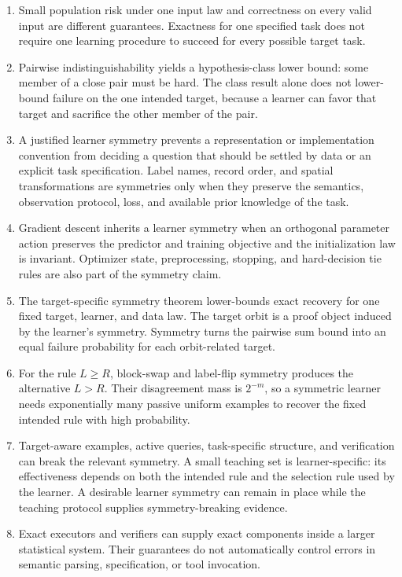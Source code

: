 \documentclass[11pt,twoside]{article}
\theoremstyle{definition}
\theoremstyle{remark}
\begin{document}
\begin{enumerate}[leftmargin=*]
\item Small population risk under one input law and correctness on every valid
input are different guarantees. Exactness for one specified task does not
require one learning procedure to succeed for every possible target task.
\item Pairwise indistinguishability yields a hypothesis-class lower bound:
some member of a close pair must be hard. The class result alone does not
lower-bound failure on the one intended target, because a learner can favor
that target and sacrifice the other member of the pair.
\item A justified learner symmetry prevents a representation or implementation
convention from deciding a question that should be settled by data or an
explicit task specification. Label names, record order, and spatial
transformations are symmetries only when they preserve the semantics,
observation protocol, loss, and available prior knowledge of the task.
\item Gradient descent inherits a learner symmetry when an orthogonal parameter
action preserves the predictor and training objective and the initialization
law is invariant. Optimizer state, preprocessing, stopping, and hard-decision
tie rules are also part of the symmetry claim.
\item The target-specific symmetry theorem lower-bounds exact recovery for one
fixed target, learner, and data law. The target orbit is a proof object induced
by the learner's symmetry. Symmetry turns the pairwise sum bound into an equal
failure probability for each orbit-related target.
\item For the rule \(L\ge R\), block-swap and label-flip symmetry produces the
alternative \(L>R\). Their disagreement mass is \(2^{-m}\), so a symmetric
learner needs exponentially many passive uniform examples to recover the fixed
intended rule with high probability.
\item Target-aware examples, active queries, task-specific structure, and
verification can break the relevant symmetry. A small teaching set is
learner-specific: its effectiveness depends on both the intended rule and the
selection rule used by the learner. A desirable learner symmetry can remain in
place while the teaching protocol supplies symmetry-breaking evidence.
\item Exact executors and verifiers can supply exact components inside a larger
statistical system. Their guarantees do not automatically control errors in
semantic parsing, specification, or tool invocation.
\end{enumerate}
\end{document}
